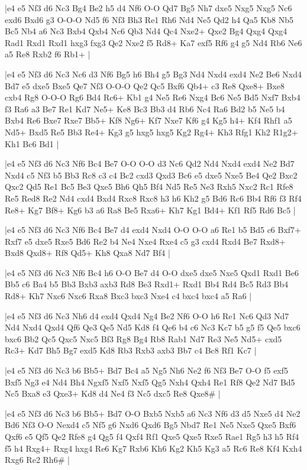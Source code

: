 \whitename{}
\blackname{}
\makegametitle
|e4 e5 Nf3 d6 Nc3 Bg4 Be2 h5 d4 Nf6 O-O Qd7 Bg5 Nh7 dxe5 Nxg5 Nxg5 Nc6 exd6 Bxd6 g3 O-O-O Nd5 f6 Nf3 Bh3 Re1 Rh6 Nd4 Ne5 Qd2 h4 Qa5 Kb8 Nb5 Bc5 Nb4 a6 Nc3 Bxb4 Qxb4 Nc6 Qb3 Nd4 Qc4 Nxe2+ Qxe2 Bg4 Qxg4 Qxg4 Rad1 Rxd1 Rxd1 hxg3 fxg3 Qe2 Nxe2 f5 Rd8+ Ka7 exf5 Rf6 g4 g5 Nd4 Rb6 Ne6 a5 Re8 Rxb2 f6 Rb1+  |

\whitename{}
\blackname{}
\makegametitle
|e4 e5 Nf3 d6 Nc3 Nc6 d3 Nf6 Bg5 h6 Bh4 g5 Bg3 Nd4 Nxd4 exd4 Ne2 Be6 Nxd4 Bd7 e5 dxe5 Bxe5 Qe7 Nf3 O-O-O Qe2 Qc5 Bxf6 Qb4+ c3 Re8 Qxe8+ Bxe8 cxb4 Rg8 O-O-O Rg6 Bd4 Rc6+ Kb1 g4 Ne5 Re6 Nxg4 Bc6 Ne5 Bd5 Nxf7 Bxb4 f3 Ra6 a3 Be7 Re1 Kd7 Ne5+ Ke8 Bc3 Bb3 d4 Rb6 Nc4 Ra6 Bd2 b5 Ne5 b4 Bxb4 Re6 Bxe7 Rxe7 Bb5+ Kf8 Ng6+ Kf7 Nxe7 Kf6 g4 Kg5 h4+ Kf4 Rhf1 a5 Nd5+ Bxd5 Re5 Bb3 Re4+ Kg3 g5 hxg5 hxg5 Kg2 Rg4+ Kh3 Rfg1 Kh2 R1g2+ Kh1 Bc6 Bd1  |

\whitename{}
\blackname{}
\makegametitle
|e4 e5 Nf3 d6 Nc3 Nf6 Bc4 Be7 O-O O-O d3 Nc6 Qd2 Nd4 Nxd4 exd4 Ne2 Bd7 Nxd4 c5 Nf3 b5 Bb3 Rc8 c3 c4 Bc2 cxd3 Qxd3 Bc6 e5 dxe5 Nxe5 Be4 Qe2 Bxc2 Qxc2 Qd5 Re1 Bc5 Be3 Qxe5 Bh6 Qh5 Bf4 Nd5 Re5 Ne3 Rxh5 Nxc2 Rc1 Rfe8 Re5 Red8 Re2 Nd4 cxd4 Bxd4 Rxc8 Rxc8 h3 h6 Kh2 g5 Bd6 Rc6 Bb4 Rf6 f3 Rf4 Re8+ Kg7 Bf8+ Kg6 b3 a6 Ra8 Be5 Rxa6+ Kh7 Kg1 Bd4+ Kf1 Rf5 Rd6 Bc5  |

\whitename{}
\blackname{}
\makegametitle
|e4 e5 Nf3 d6 Nc3 Nf6 Bc4 Be7 d4 exd4 Nxd4 O-O O-O a6 Re1 b5 Bd5 c6 Bxf7+ Rxf7 e5 dxe5 Rxe5 Bd6 Re2 b4 Ne4 Nxe4 Rxe4 c5 g3 cxd4 Rxd4 Be7 Rxd8+ Bxd8 Qxd8+ Rf8 Qd5+ Kh8 Qxa8 Nd7 Bf4  |

\whitename{}
\blackname{}
\makegametitle
|e4 e5 Nf3 d6 Nc3 Nf6 Bc4 h6 O-O Be7 d4 O-O dxe5 dxe5 Nxe5 Qxd1 Rxd1 Be6 Bb5 c6 Ba4 b5 Bb3 Bxb3 axb3 Rd8 Be3 Rxd1+ Rxd1 Bb4 Rd4 Bc5 Rd3 Bb4 Rd8+ Kh7 Nxc6 Nxc6 Rxa8 Bxc3 bxc3 Nxe4 c4 bxc4 bxc4 a5 Ra6  |

\whitename{}
\blackname{}
\makegametitle
|e4 e5 Nf3 d6 Nc3 Nh6 d4 exd4 Qxd4 Ng4 Be2 Nf6 O-O h6 Re1 Nc6 Qd3 Nd7 Nd4 Nxd4 Qxd4 Qf6 Qe3 Qe5 Nd5 Kd8 f4 Qe6 b4 c6 Nc3 Kc7 b5 g5 f5 Qe5 bxc6 bxc6 Bb2 Qc5 Qxc5 Nxc5 Bf3 Rg8 Bg4 Rb8 Rab1 Nd7 Re3 Ne5 Nd5+ cxd5 Rc3+ Kd7 Bh5 Bg7 exd5 Kd8 Rb3 Rxb3 axb3 Bb7 c4 Bc8 Rf1 Kc7  |

\whitename{}
\blackname{}
\makegametitle
|e4 e5 Nf3 d6 Nc3 b6 Bb5+ Bd7 Bc4 a5 Ng5 Nh6 Ne2 f6 Nf3 Be7 O-O f5 exf5 Bxf5 Ng3 e4 Nd4 Bh4 Ngxf5 Nxf5 Nxf5 Qg5 Nxh4 Qxh4 Re1 Rf8 Qe2 Nd7 Bd5 Nc5 Bxa8 e3 Qxe3+ Kd8 d4 Ne4 f3 Nc5 dxc5 Re8 Qxe8\#  |

\whitename{}
\blackname{}
\makegametitle
|e4 e5 Nf3 d6 Nc3 b6 Bb5+ Bd7 O-O Bxb5 Nxb5 a6 Nc3 Nf6 d3 d5 Nxe5 d4 Ne2 Bd6 Nf3 O-O Nexd4 c5 Nf5 g6 Nxd6 Qxd6 Bg5 Nbd7 Re1 Ne5 Nxe5 Qxe5 Bxf6 Qxf6 e5 Qf5 Qe2 Rfe8 g4 Qg5 f4 Qxf4 Rf1 Qxe5 Qxe5 Rxe5 Rae1 Rg5 h3 h5 Rf4 f5 h4 Rxg4+ Rxg4 hxg4 Re6 Kg7 Rxb6 Kh6 Kg2 Kh5 Kg3 a5 Rc6 Re8 Kf4 Kxh4 Rxg6 Re2 Rh6\#  |


